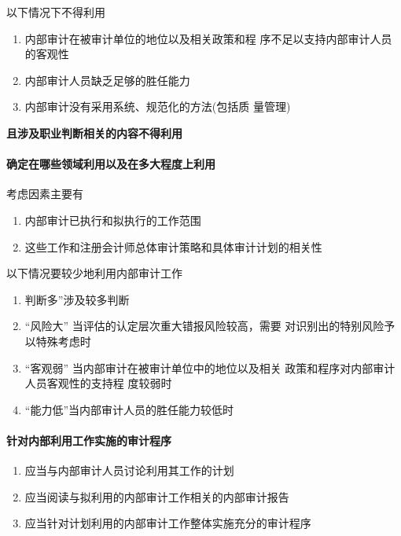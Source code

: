 \documentclass[UTF8,12pt]{ctexart}
\numberwithin{equation}{section} %
\numberwithin{figure}{section}
\numberwithin{table}{section}
\begin{document}
	以下情况下不得利用
	\begin{enumerate}
		\item 内部审计在被审计单位的地位以及相关政策和程 序不足以支持内部审计人员的客观性 
		
		\item 内部审计人员缺乏足够的胜任能力 
		
		\item 内部审计没有采用系统、规范化的方法(包括质 量管理)
	\end{enumerate}
	
	\textbf{且涉及职业判断相关的内容不得利用}
	
	\paragraph{确定在哪些领域利用以及在多大程度上利用}
	考虑因素主要有
	\begin{enumerate}
		\item 内部审计已执行和拟执行的工作范围
		
		\item 这些工作和注册会计师总体审计策略和具体审计计划的相关性
	\end{enumerate}
	
	以下情况要较少地利用内部审计工作
	\begin{enumerate}
		\item 判断多”涉及较多判断 
		
		\item “风险大” 当评估的认定层次重大错报风险较高，需要 对识别出的特别风险予以特殊考虑时
		
		\item “客观弱” 当内部审计在被审计单位中的地位以及相关 政策和程序对内部审计人员客观性的支持程 度较弱时
		
		\item “能力低”当内部审计人员的胜任能力较低时
	\end{enumerate}
	
	\paragraph{针对内部利用工作实施的审计程序}
	\begin{enumerate}
		\item 应当与内部审计人员讨论利用其工作的计划
		
		\item 应当阅读与拟利用的内部审计工作相关的内部审计报告
		
		\item 应当针对计划利用的内部审计工作整体实施充分的审计程序
	\end{enumerate}
	
\end{document}
